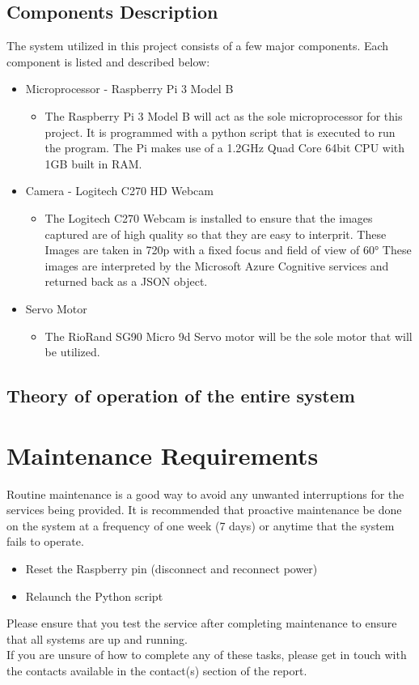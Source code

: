 \documentclass[a4paper,12pt]{article}
\begin{document}
\newpage
\subsection{Components Description}

The system utilized in this project consists of a few major components. Each component is listed and described below:

\begin{itemize}
\item Microprocessor - Raspberry Pi 3 Model B
\begin{itemize}
    \item The Raspberry Pi 3 Model B will act as the sole microprocessor for this project. It is programmed with a python script that is executed to run the program. The Pi makes use of  a 1.2GHz Quad Core 64bit CPU with 1GB built in RAM.
\end{itemize} 
\item Camera - Logitech C270 HD Webcam
\begin{itemize}
    \item The Logitech C270 Webcam is installed to ensure that the images captured are of high quality so that they are easy to interprit. These Images are taken in 720p with a fixed focus and field of view of \ang{60} These images are interpreted by the Microsoft Azure Cognitive services and returned back as a JSON object.
\end{itemize}
\item Servo Motor
\begin{itemize}
    \item The RioRand SG90 Micro 9d Servo motor will be the sole motor that will be utilized. 
\end{itemize}
\end{itemize}

\subsection{Theory of operation of the entire system}

\newpage
\section{Maintenance Requirements}
Routine maintenance is a good way to avoid any unwanted interruptions for the services being provided. It is recommended that proactive maintenance be done on the system at a frequency of one week (7 days) or anytime that the system fails to operate.
\begin{itemize}
    \item Reset the Raspberry pin (disconnect and reconnect power)
    \item Relaunch the Python script
\end{itemize}
Please ensure that you test the service after completing maintenance to ensure that all systems are up and running. \\
If you are unsure of how to complete any of these tasks, please get in touch with the contacts available in the contact(s) section of the report.
\end{document}

